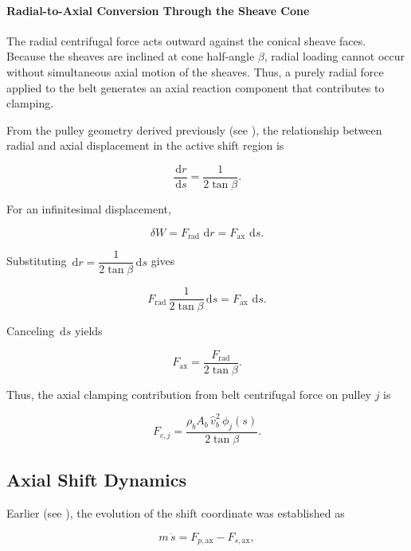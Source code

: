\documentclass[11pt]{article}
\numberwithin{equation}{section}
\newcommand{\dd}{\,\mathrm{d}}
\begin{document}
\paragraph{Radial-to-Axial Conversion Through the Sheave Cone}

The radial centrifugal force acts outward against the conical sheave faces.
Because the sheaves are inclined at cone half-angle \(\beta\), radial loading
cannot occur without simultaneous axial motion of the sheaves.
Thus, a purely radial force applied to the belt generates an axial
reaction component that contributes to clamping.

From the pulley geometry derived previously (see ),
the relationship between radial and axial displacement in the active
shift region is

\[
\frac{\dd r}{\dd s}
=
\frac{1}{2\tan\beta}.
\]

For an infinitesimal displacement,

\[
\delta W
=
F_{\mathrm{rad}}\,\dd r
=
F_{\mathrm{ax}}\,\dd s.
\]

Substituting \(\dd r = \dfrac{1}{2\tan\beta}\dd s\) gives

\[
F_{\mathrm{rad}}\,
\frac{1}{2\tan\beta}\dd s
=
F_{\mathrm{ax}}\,\dd s.
\]

Canceling \(\dd s\) yields

\[
F_{\mathrm{ax}}
=
\frac{F_{\mathrm{rad}}}{2\tan\beta}.
\]

Thus, the axial clamping contribution from belt centrifugal force on pulley \(j\) is

\begin{equation}
F_{c,j}
=
\frac{
\rho_b A_b\,\hat{v}_b^2\,\phi_j(s)
}{
2\tan\beta
}.
\label{eq:Fcj_general}
\end{equation}

\subsection{Axial Shift Dynamics}\label{sec:shift-dyn}

Earlier (see ),
the evolution of the shift coordinate was established as

\begin{equation}
m\,\ddot{s}
=
F_{p,\text{ax}} - F_{s,\text{ax}},
\label{eq:axial_newton_base_recall}
\end{equation}
\end{document}
